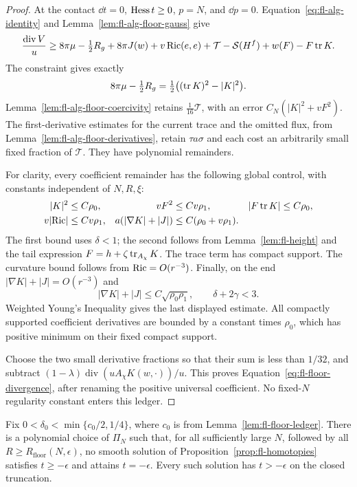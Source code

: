 \begin{proof}
At the contact \(\dd t=0\), \(\operatorname{Hess} t\ge0\), \(p=N\), and
\(\dd p=0\).
Equation~\eqref{eq:fl-alg-identity} and
Lemma~\ref{lem:fl-alg-floor-gauss} give
\[
 \frac{\operatorname{div}V}{u}
 \ge 8\pi\mu-\tfrac12R_g+8\pi J(w)+v\operatorname{Ric}(e,e)
        +\mathcal T-\mathcal S(H^f)+w(F)-F\operatorname{tr} K .
\]
The constraint gives exactly
\[
 8\pi\mu-\tfrac12R_g
       =\tfrac12\bigl((\operatorname{tr} K)^2-\lvert K\rvert^2\bigr).
\]
Lemma~\ref{lem:fl-alg-floor-coercivity} retains
\(\tfrac1{16}\mathcal T\), with an error
\(C_N(\lvert K\rvert^2+vF^2)\).
The first-derivative estimates for the current trace and the omitted
flux, from Lemma~\ref{lem:fl-alg-floor-derivatives}, retain \(\tau a\sigma\)
and each cost an arbitrarily small fixed fraction of \(\mathcal T\).
They have polynomial remainders.

For clarity, every coefficient remainder has the following global
control, with constants independent of \(N,R,\xi\):
\begin{align*}
 \lvert K\rvert^2&\le C\rho_0,&
 vF^2&\le Cv\rho_1,&
 \lvert F\operatorname{tr} K\rvert&\le C\rho_0,\\
 v\lvert\operatorname{Ric}\rvert&\le Cv\rho_1,&
 a(\lvert\nabla K\rvert+\lvert J\rvert)
      &\le C(\rho_0+v\rho_1).
\end{align*}
The first bound uses \(\delta<1\); the second follows from
Lemma~\ref{lem:fl-height} and the tail expression
\(F=h+\zeta\operatorname{tr}_{A_\chi}K\).
The trace term has compact support.  The curvature bound follows
from \(\operatorname{Ric}=O(r^{-3})\).
Finally, on the end
\(\lvert\nabla K\rvert+\lvert J\rvert=O(r^{-3})\) and
\[
 \lvert\nabla K\rvert+\lvert J\rvert
       \le C\sqrt{\rho_0\rho_1},
 \qquad \delta+2\gamma<3 .
\]
Weighted Young's Inequality gives the last displayed estimate.
All compactly supported coefficient derivatives are bounded by a
constant times \(\rho_0\), which has positive minimum on their
fixed compact support.

Choose the two small derivative fractions so that their sum is less
than \(1/32\), and subtract
\((1-\lambda)\operatorname{div}(uA_\chi K(w,\cdot))/u\).
This proves Equation~\eqref{eq:fl-floor-divergence}, after renaming
the positive universal coefficient.  No fixed-\(N\) regularity
constant enters this ledger.
\end{proof}

\begin{proposition}
\label{prop:fl-floor}
Fix \(0<\delta_0<\min\{c_0/2,1/4\}\), where \(c_0\) is from
Lemma~\ref{lem:fl-floor-ledger}.  There is a polynomial choice of
\(\Pi_N\) such that, for all sufficiently large \(N\), followed by
all \(R\ge R_{\mathrm{floor}}(N,\epsilon)\), no smooth solution
of Proposition~\ref{prop:fl-homotopies} satisfies \(t\ge-\epsilon\)
and attains \(t=-\epsilon\).  Every such solution has \(t>-\epsilon\)
on the closed truncation.
\end{proposition}

